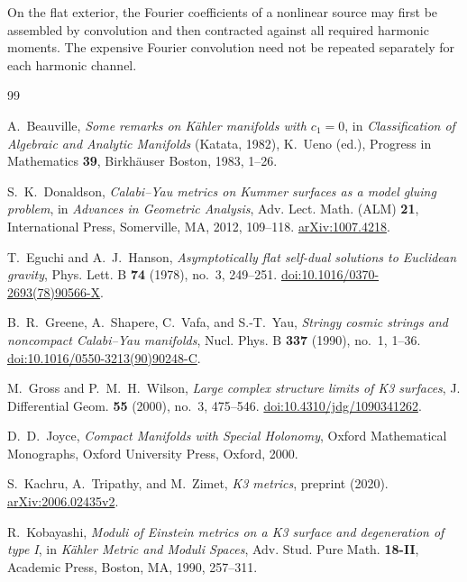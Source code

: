 \documentclass[11pt,a4paper,twoside]{article}
\numberwithin{equation}{section}
\theoremstyle{definition}
\theoremstyle{remark}
\begin{document}
On the flat exterior, the Fourier coefficients of a nonlinear source
may first be assembled by convolution and then contracted against all
required harmonic moments.  The expensive Fourier convolution need
not be repeated separately for each harmonic channel.


\clearpage

\begin{thebibliography}{99}

A.~Beauville,
\emph{Some remarks on K\"ahler manifolds with \(c_1=0\)},
in \emph{Classification of Algebraic and Analytic Manifolds}
(Katata, 1982), K.~Ueno (ed.),
Progress in Mathematics \textbf{39}, Birkh\"auser Boston,
1983, 1--26.


S.~K.~Donaldson,
\emph{Calabi--Yau metrics on Kummer surfaces as a model gluing problem},
in \emph{Advances in Geometric Analysis},
Adv. Lect. Math. (ALM) \textbf{21}, International Press,
Somerville, MA, 2012, 109--118.
\href{https://arxiv.org/abs/1007.4218}{arXiv:1007.4218}.


T.~Eguchi and A.~J.~Hanson,
\emph{Asymptotically flat self-dual solutions to Euclidean gravity},
Phys. Lett. B \textbf{74} (1978), no.~3, 249--251.
\href{https://doi.org/10.1016/0370-2693(78)90566-X}{doi:10.1016/0370-2693(78)90566-X}.

B.~R.~Greene, A.~Shapere, C.~Vafa, and S.-T.~Yau,
\emph{Stringy cosmic strings and noncompact Calabi--Yau manifolds},
Nucl. Phys. B \textbf{337} (1990), no.~1, 1--36.
\href{https://doi.org/10.1016/0550-3213(90)90248-C}{doi:10.1016/0550-3213(90)90248-C}.


M.~Gross and P.~M.~H.~Wilson,
\emph{Large complex structure limits of K3 surfaces},
J. Differential Geom. \textbf{55} (2000), no.~3, 475--546.
\href{https://doi.org/10.4310/jdg/1090341262}{doi:10.4310/jdg/1090341262}.

D.~D.~Joyce,
\emph{Compact Manifolds with Special Holonomy},
Oxford Mathematical Monographs, Oxford University Press, Oxford, 2000.

S.~Kachru, A.~Tripathy, and M.~Zimet,
\emph{K3 metrics}, preprint (2020).
\href{https://arxiv.org/abs/2006.02435v2}{arXiv:2006.02435v2}.


R.~Kobayashi,
\emph{Moduli of Einstein metrics on a K3 surface and degeneration of type I},
in \emph{K\"ahler Metric and Moduli Spaces},
Adv. Stud. Pure Math. \textbf{18-II}, Academic Press, Boston, MA,
1990, 257--311.


\end{thebibliography}
\end{document}
